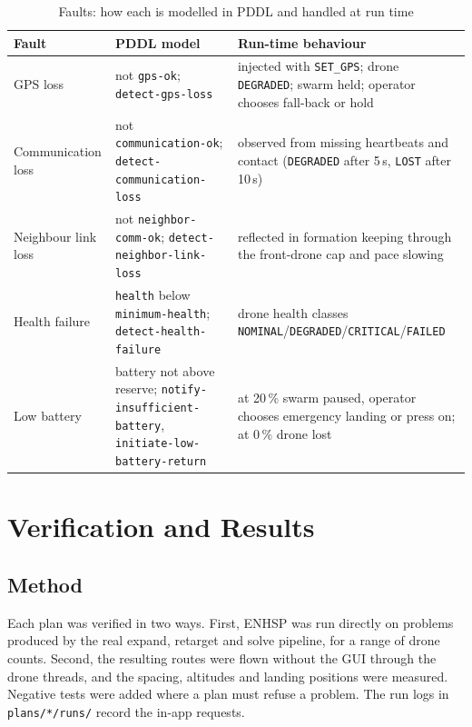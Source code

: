 \documentclass[11pt,a4paper,oneside]{report}
\newcommand{\code}[1]{\texttt{#1}}
\begin{document}
\begin{table}[H]
\caption[Faults and run-time responses]{Faults: how each is modelled in PDDL and handled at run time}\label{tab:faultmap}
\small
\begin{tabularx}{\textwidth}{@{}P{0.17\textwidth}P{0.32\textwidth}Y@{}}
\toprule
\textbf{Fault} & \textbf{PDDL model} & \textbf{Run-time behaviour} \\
\midrule
GPS loss & not \code{gps-ok}; \code{detect-gps-loss} & injected with \code{SET\_GPS}; drone
\code{DEGRADED}; swarm held; operator chooses fall-back or hold \\
Communication loss & not \code{communication-ok}; \code{detect-communication-loss} & observed
from missing heartbeats and contact (\code{DEGRADED} after 5\,s, \code{LOST} after 10\,s) \\
Neighbour link loss & not \code{neighbor-comm-ok}; \code{detect-neighbor-link-loss} & reflected
in formation keeping through the front-drone cap and pace slowing \\
Health failure & \code{health} below \code{minimum-health}; \code{detect-health-failure} &
drone health classes \code{NOMINAL}/\code{DEGRADED}/\code{CRITICAL}/\code{FAILED} \\
Low battery & battery not above reserve; {\small\code{notify-insufficient-battery}},
\code{initiate-low-battery-return} & at 20\,\% swarm paused, operator chooses emergency landing
or press on; at 0\,\% drone lost \\
\bottomrule
\end{tabularx}
\end{table}

\chapter{Verification and Results}\label{ch:results}

\section{Method}
Each plan was verified in two ways. First, ENHSP was run directly on problems produced by the real
expand, retarget and solve pipeline, for a range of drone counts. Second, the resulting routes were
flown without the GUI through the drone threads, and the spacing, altitudes
and landing positions were measured. Negative tests were added where a plan must refuse a
problem. The run logs in \code{plans/*/runs/} record the in-app requests.
\end{document}
